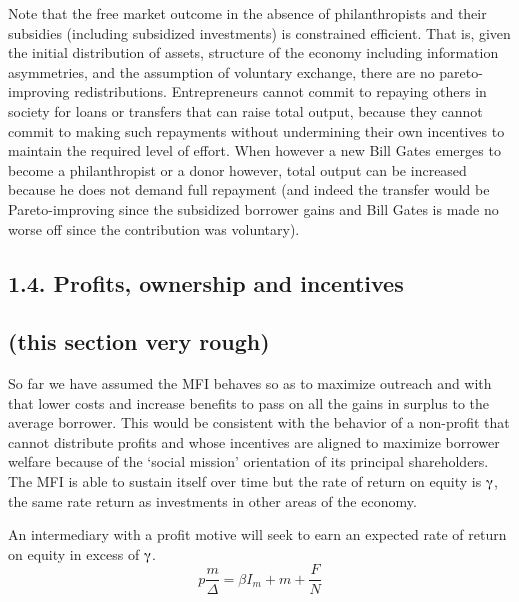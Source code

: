 \documentclass{article} %
\begin{document}
Note that the free market outcome in the absence of philanthropists and their subsidies (including subsidized investments) is constrained efficient. That is, given the initial distribution of assets, structure of the economy including information asymmetries, and the assumption of voluntary exchange, there are no pareto-improving redistributions. Entrepreneurs cannot commit to repaying others in society for loans or transfers that can raise total output, because they cannot commit to making such repayments without undermining their own incentives to maintain the required level of effort. When however a new Bill Gates emerges to become a philanthropist or a donor however, total output can be increased because he does not demand full repayment (and indeed the transfer would be Pareto-improving since the subsidized borrower gains and Bill Gates is made no worse off since the contribution was voluntary). 

\noindent 
\subsection{1.4. Profits, ownership and incentives }

\noindent 
\subsection{(this section very rough)}

So far we have assumed the MFI behaves so as to maximize outreach and with that lower costs and increase benefits to pass on all the gains in surplus to the average borrower.  This would be consistent with the behavior of a non-profit that cannot distribute profits and whose incentives are aligned to maximize borrower welfare because of the `social mission' orientation of its principal shareholders.  The MFI is able to sustain itself over time but the rate of return on equity is $\mathrm{\gammaup }$, the same rate return as investments in other areas of the economy. 

An intermediary with a profit motive will seek to earn an expected rate of return on equity in excess of $\mathrm{\gammaup }$. 
\begin{equation} \label{15)} 
p\frac{m}{\Delta } =\beta I_{m} +m+\frac{F}{N}  
\end{equation} 
\end{document}
